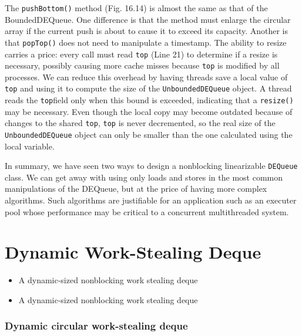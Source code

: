 The \lstinline!pushBottom()! method (Fig. 16.14) is almost the same as
that of the BoundedDEQueue. One difference is that the method must
enlarge the circular array if the current push is about to cause it to
exceed its capacity. Another is that \lstinline!popTop()! does not
need to manipulate a timestamp. The ability to resize carries a price:
every call must read \lstinline!top! (Line 21) to determine if a
resize is necessary, possibly causing more cache misses because
\lstinline!top! is modified by all processes. We can reduce this
overhead by having threads save a local value of \lstinline!top! and
using it to compute the size of the \lstinline!UnboundedDEQueue!
object. A thread reads the \lstinline!top!field only when this bound
is exceeded, indicating that a \lstinline!resize()! may be necessary.
Even though the local copy may become outdated because of changes to
the shared \lstinline!top!, \lstinline!top! is never decremented, so
the real size of the \lstinline!UnboundedDEQueue! object can only be
smaller than the one calculated using the local variable.

In summary, we have seen two ways to design a nonblocking linearizable
\lstinline!DEQueue! class. We can get away with using only loads and
stores in the most common manipulations of the DEQueue, but at the
price of having more complex algorithms. Such algorithms are
justifiable for an application such as an executer pool whose
performance may be critical to a concurrent multithreaded system.




\section{Dynamic Work-Stealing Deque}
\label{sec:queues-implementation-dynamic-ws-deque}

\begin{itemize}
\item A dynamic-sized nonblocking work stealing deque
  \cite{Hendler2006}
\item A dynamic-sized nonblocking work stealing deque
  \cite{Hendler2006a}
\end{itemize}


\subsubsection{Dynamic circular work-stealing deque \cite{Chase2005}}

